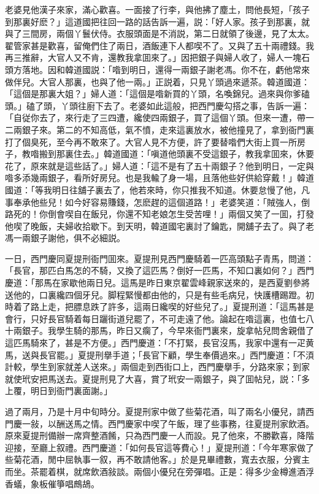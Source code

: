 老婆見他漢子來家，滿心歡喜。一面接了行李，與他拂了塵土，問他長短，「孩子到那裏好麽？」這道國把往回一路的話告訴一遍，説：「好人家。孩子到那裏，就與了三間房，兩個丫鬟伏侍。衣服頭面是不消説，第二日就領了後邊，見了太太。翟管家甚是歡喜，留俺們住了兩日，酒飯連下人都喫不了。又與了五十兩禮錢。我再三推辭，大官人又不肯，還教我拿囬來了。」因把銀子與婦人收了，婦人一塊石頭方落地。因和韓道國説：「喒到明日，還得一兩銀子謝老馮。你不在，虧他常來做伴兒。大官人那裏，也與了他一兩。」正説着，只見丫頭過來遞茶。韓道國道：「這個是那裏大姐？」婦人道：「這個是喒新買的丫頭，名喚錦兒。過來與你爹磕頭。」磕了頭，丫頭往廚下去了。老婆如此這般，把西門慶勾搭之事，告訴一遍：「自従你去了，來行走了三四遭，纔使四兩銀子，買了這個丫頭。但來一遭，帶一二兩銀子來。第二的不知高低，氣不憤，走來這裏放水，被他撞見了，拿到衙門裏打了個臭死，至今再不敢來了。大官人見不方便，許了要替喒們大街上買一所房子，教喒搬到那裏住去。」韓道國道：「嗔道他頭裏不受這銀子，教我拿囬來，休要花了，原來就是這些話了。」婦人道：「這不是有了五十兩銀子？他到明日，一定與喒多添幾兩銀子，看所好房兒。也是我輸了身一場，且落他些好供給穿戴！」韓道國道：「等我明日往舖子裏去了，他若來時，你只推我不知道。休要怠慢了他，凡事奉承他些兒！如今好容易賺錢，怎麽趕的這個道路！」老婆笑道：「賊強人，倒路死的！你倒會喫自在飯兒，你還不知老娘怎生受苦哩！」兩個又笑了一囬，打發他喫了晚飯，夫婦收拾歇下。到天明，韓道國宅裏討了鑰匙，開舖子去了。與了老馮一兩銀子謝他，俱不必細説。

一日，西門慶同夏提刑衙門囬來。夏提刑見西門慶騎着一匹高頭點子青馬，問道：「長官，那匹白馬怎的不騎，又換了這匹馬？倒好一匹馬，不知口裏如何？」西門慶道：「那馬在家歇他兩日兒。這馬是昨日東京翟雲峰親家送來的，是西夏劉參將送他的，口裏纔四個牙兒。脚程緊慢都由他的，只是有些毛病兒，快護槽踢蹬。初時着了路上走，把膘息跌了許多，這兩日纔喫的好些兒了。」夏提刑道：「這馬甚是會行，只好長官騎着每日躧街道兒罷了，不可走遠了他。論起在喒這裏，也值七八十兩銀子。我學生騎的那馬，昨日又瘸了，今早來衙門裏來，旋拿帖兒問舍親借了這匹馬騎來了，甚是不方便。」西門慶道：「不打緊，長官沒馬，我家中還有一疋黄馬，送與長官罷。」夏提刑擧手道；「長官下顧，學生奉價過來。」西門慶道：「不湏計較，學生到家就差人送來。」兩個走到西街口上，西門慶擧手，分路來家；到家就使玳安把馬送去。夏提刑見了大喜，賞了玳安一兩銀子，與了囬帖兒，説：「多上覆，明日到衙門裏面謝。」

過了兩月，乃是十月中旬時分。夏提刑家中做了些菊花酒，叫了兩名小優兒，請西門慶一敍，以酬送馬之情。西門慶家中喫了午飯，理了些事務，往夏提刑家飲酒。原來夏提刑備辦一席齊整酒餚，只為西門慶一人而設。見了他來，不勝歡喜，降階迎接，至廳上叙禮。西門慶道：「如何長官這等費心！」夏提刑道：「今年寒家做了些菊花酒，閒中屈執事一叙，再不敢請他客。」於是見畢禮數，寬去衣服，分賓主而坐。茶罷着棋，就席飲酒敍談。兩個小優兒在旁彈唱。正是：得多少金樽進酒浮香蟻，象板催箏唱鷓鴣。

